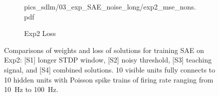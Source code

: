\begin{figure}
\begin{subfigure}[c]{0.48\textwidth}
{			{pics_sdlm/03_exp_SAE_noise_long/exp2_mse_nons.pdf}}
		\\
		\caption{Exp2 Loss}
	\end{subfigure}%
	\caption[Comparisons of solutions in training SAE.]{Comparisons of weights and loss of solutions for training SAE on Exp2: [S1] longer STDP window, [S2] noisy threshold, [S3] teaching signal, and [S4] combined solutions. 10 visible units fully connects to 10 hidden units with Poisson spike trains of firing rate ranging from 10~Hz to 100~Hz.}
	\label{fig:sols_ae}
\end{figure}

